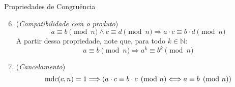 \begin{frame}[fragile]{Propriedades de Congruência}
    \begin{enumerate}
          \setcounter{enumi}{5}
        \item \label{item:propcong6-produto} (\textit{Compatibilidade com o produto})
        \begin{equation*}
            a \equiv b \pmod{n} \land c \equiv d \pmod{n} \Longrightarrow a \cdot c \equiv b \cdot d \pmod{n}
        \end{equation*}
        A partir dessa propriedade, note que, para todo $k \in \mathbb{N}$:
        \begin{equation*}
            a \equiv b \pmod{n} \Longrightarrow a^k \equiv b^k \pmod{n}
        \end{equation*}
        \item \label{item:propcong7-cancelamento} (\textit{Cancelamento}) 
        \begin{equation*}
            \operatorname{mdc}(c, n) = 1 \Longrightarrow (a \cdot c \equiv b \cdot c \pmod{n} \Longleftrightarrow a \equiv b \pmod{n})
        \end{equation*}
    \end{enumerate}
\end{frame}